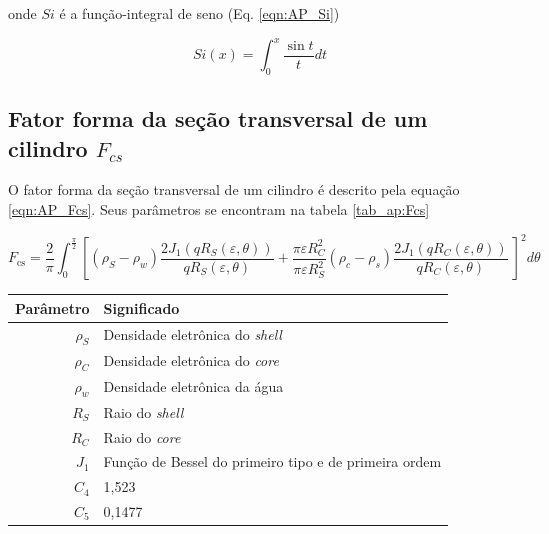 \begin{apendicesenv}
\noindent onde $Si$ é a função-integral de seno (Eq. \ref{eqn:AP_Si})

\begin{equation}
Si(x) = \int_0^x \frac{\sin t}{t}dt
\label{eqn:AP_Si}
\end{equation}

\subsection{Fator forma da seção transversal de um cilindro $F_{cs}$}

O fator forma da seção transversal de um cilindro é descrito pela equação \ref{eqn:AP_Fcs}. Seus parâmetros se encontram na tabela \ref{tab_ap:Fcs}

\begin{equation}
F_{\text{cs}} = \frac{2}{\pi}\int_{0}^{\frac{\pi}{2}}%
%
\left[ \left(\rho_{S} - \rho_{w} \right) \frac{2J_1 \left( qR_{S}\left( \varepsilon,\theta \right) \right)}{qR_{S}\left( \varepsilon,\theta \right)} %
%
+  %
%
\frac{\pi\varepsilon R_C^2}{\pi\varepsilon R_S^2}\left( \rho_c - \rho_s \right)	%
%
\frac{2J_1\left( qR_{C}\left( \varepsilon,\theta \right) \right)}{qR_{C}\left( \varepsilon,\theta \right)}\  \right]^2 d\theta
\label{eqn:AP_Fcs}
\end{equation}


\begin{table}
    {\begin{tabular}{r l}
            \toprule
            Parâmetro 			& Significado \\
            \midrule
            $\rho_S$			&  Densidade eletrônica do \emph{shell} \\
            $\rho_C$			&  Densidade eletrônica do \emph{core}  \\
            $\rho_w$			&  Densidade eletrônica da água			\\
            $R_S$			& Raio do \emph{shell} 						\\
            $R_C$			& Raio do \emph{core}						\\
            $J_1$			&  Função de Bessel do primeiro tipo e de primeira ordem\\
            $C_4$			&  1,523	\\
            $C_5$			&  0,1477 	\\						
            \bottomrule
        \end{tabular}}%
    {}%
\end{table}


\end{apendicesenv}
